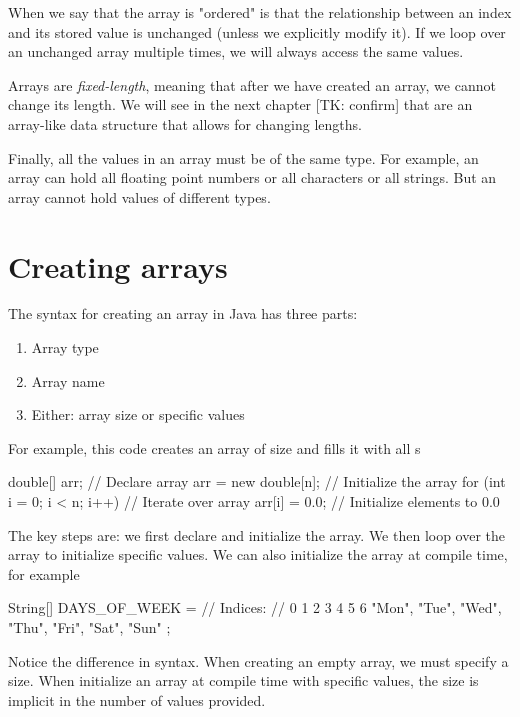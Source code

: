 When we say that the array is "ordered" is that the relationship between an index and its stored value is unchanged (unless we explicitly modify it). If we loop over an unchanged array multiple times, we will always access the same values.

Arrays are \emph{fixed-length}, meaning that after we have created an array, we cannot change its length. We will see in the next chapter [TK: confirm] that  are an array-like data structure that allows for changing lengths.

Finally, all the values in an array must be of the same type. For example, an array can hold all floating point numbers or all characters or all strings. But an array cannot hold values of different types.

\section{Creating arrays}

The syntax for creating an array in Java has three parts:

\begin{enumerate}
\item Array type
\item Array name
\item Either: array size or specific values
\end{enumerate}

For example, this code creates an array of size  and fills it with all s

\begin{code}
double[] arr;                    // Declare array
arr = new double[n];             // Initialize the array
for (int i = 0; i < n; i++) {    // Iterate over array
    arr[i] = 0.0;                // Initialize elements to 0.0
}
\end{code}

The key steps are: we first declare and initialize the array. We then loop over the array to initialize specific values. We can also initialize the array at compile time, for example

\begin{code}
String[] DAYS_OF_WEEK = {
//  Indices:
//  0      1      2      3      4      5      6
    "Mon", "Tue", "Wed", "Thu", "Fri", "Sat", "Sun"
};
\end{code}

Notice the difference in syntax. When creating an empty array, we must specify a size. When initialize an array at compile time with specific values, the size is implicit in the number of values provided.

